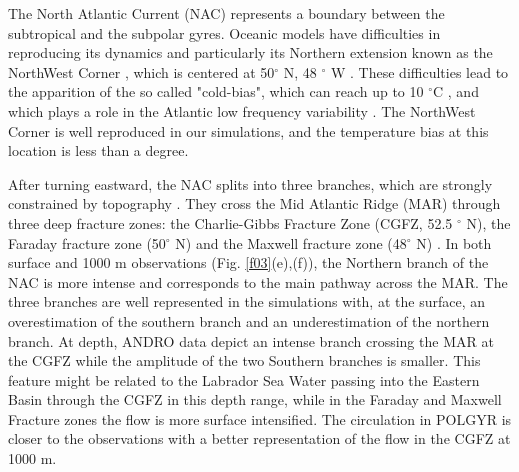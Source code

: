 \documentclass[os, manuscript]{copernicus}
\begin{document}
The North Atlantic Current (NAC) represents a boundary between the subtropical and the subpolar gyres. Oceanic models have difficulties in reproducing its dynamics and particularly its Northern extension known as the NorthWest Corner \citep{bryan2007,hecht2008,drews2015}, which is centered at 50$^{\circ}$ N, 48 $^{\circ}$ W \citep{lazier1994}. These difficulties lead to the apparition of the so called "cold-bias", which can reach up to 10 $^{\circ}$C \citep{griffies2009, drews2015}, and which plays a role in the Atlantic low frequency variability \citep{drews2017}. The NorthWest Corner is well reproduced in our simulations, and the temperature bias at this location is less than a degree.


After turning eastward, the NAC splits into three branches, which are strongly constrained by topography \citep{bower2008}. They cross the Mid Atlantic Ridge (MAR) through three deep fracture zones: the Charlie-Gibbs Fracture Zone (CGFZ, 52.5 $^{\circ}$ N), the Faraday fracture zone (50$^{\circ}$ N) and the Maxwell fracture zone (48$^{\circ}$ N) \citep{bower2002}. In both surface and 1000 m observations (Fig. \ref{f03}(e),(f)), the Northern branch of the NAC is more intense and corresponds to the main pathway across the MAR. The three branches are well represented in the simulations with, at the surface, an overestimation of the southern branch and an underestimation of the northern branch. At depth, ANDRO data depict an intense branch crossing the MAR at the CGFZ while the amplitude of the two Southern branches is smaller. This feature might be related to the Labrador Sea Water passing into the Eastern Basin through the CGFZ in this depth range, while in the Faraday and Maxwell Fracture zones the flow is more surface intensified. The circulation in POLGYR is closer to the observations with a better representation of the flow in the CGFZ at 1000 m. 
\end{document}
